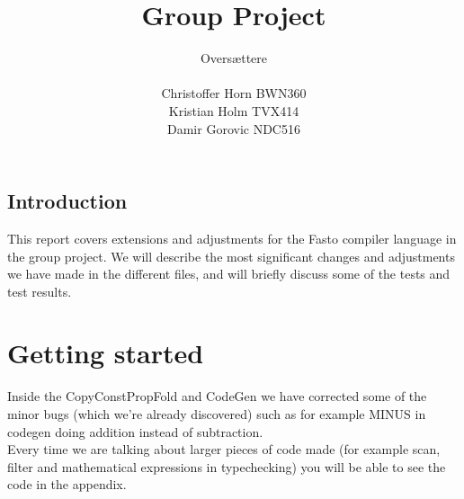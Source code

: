\documentclass[12pt]{article}
\author{Oversættere\\\\Christoffer Horn BWN360\\Kristian Holm TVX414\\Damir Gorovic NDC516}
\title{Group Project}
\begin{document}
\maketitle
\hfil \break
\hfil \break
\hfil \break
\subsection*{Introduction}
This report covers extensions and adjustments for the Fasto compiler language in the group project. We will describe the most significant changes and adjustments we have made in the different files, and will briefly discuss some of the tests and test results.
\pagebreak
\tableofcontents
\pagebreak
\section{Getting started}
Inside the CopyConstPropFold and CodeGen we have corrected some of the minor bugs (which we're already discovered) such as for example MINUS in codegen doing addition instead of subtraction.\\
Every time we are talking about larger pieces of code made (for example scan, filter and mathematical expressions in typechecking) you will be able to see the code in the appendix.
\end{document}
